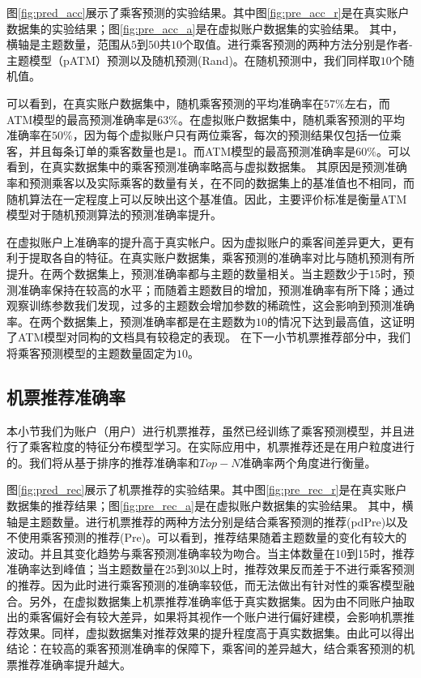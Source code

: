 图\ref{fig:pred_acc}展示了乘客预测的实验结果。其中图\ref{fig:pre_acc_r}是在真实账户数据集的实验结果；图\ref{fig:pre_acc_a}是在虚拟账户数据集的实验结果。
其中，横轴是主题数量，范围从$5$到$50$共$10$个取值。进行乘客预测的两种方法分别是作者-主题模型（pATM）预测以及随机预测(Rand)。在随机预测中，我们同样取$10$个随机值。

可以看到，在真实账户数据集中，随机乘客预测的平均准确率在$57\%$左右，而ATM模型的最高预测准确率是$63\%$。在虚拟账户数据集中，随机乘客预测的平均准确率在$50\%$，因为每个虚拟账户只有两位乘客，每次的预测结果仅包括一位乘客，并且每条订单的乘客数量也是$1$。而ATM模型的最高预测准确率是$60\%$。可以看到，在真实数据集中的乘客预测准确率略高与虚拟数据集。
其原因是预测准确率和预测乘客以及实际乘客的数量有关，在不同的数据集上的基准值也不相同，而随机算法在一定程度上可以反映出这个基准值。因此，主要评价标准是衡量ATM模型对于随机预测算法的预测准确率提升。

在虚拟账户上准确率的提升高于真实帐户。因为虚拟账户的乘客间差异更大，更有利于提取各自的特征。在真实账户数据集，乘客预测的准确率对比与随机预测有所提升。在两个数据集上，预测准确率都与主题的数量相关。当主题数少于$15$时，预测准确率保持在较高的水平；而随着主题数目的增加，预测准确率有所下降；通过观察训练参数我们发现，过多的主题数会增加参数的稀疏性，这会影响到预测准确率。在两个数据集上，预测准确率都是在主题数为$10$的情况下达到最高值，这证明了ATM模型对同构的文档具有较稳定的表现。
在下一小节机票推荐部分中，我们将乘客预测模型的主题数量固定为$10$。


\subsection{机票推荐准确率}
本小节我们为账户（用户）进行机票推荐，虽然已经训练了乘客预测模型，并且进行了乘客粒度的特征分布模型学习。在实际应用中，机票推荐还是在用户粒度进行的。我们将从基于排序的推荐准确率和$Top-N$准确率两个角度进行衡量。

\begin{figure}
\centering
{}
\end{figure}

图\ref{fig:pred_rec}展示了机票推荐的实验结果。其中图\ref{fig:pre_rec_r}是在真实账户数据集的推荐结果；图\ref{fig:pre_rec_a}是在虚拟账户数据集的实验结果。
其中，横轴是主题数量。进行机票推荐的两种方法分别是结合乘客预测的推荐(pdPre)以及不使用乘客预测的推荐(Pre)。可以看到，推荐结果随着主题数量的变化有较大的波动。并且其变化趋势与乘客预测准确率较为吻合。当主体数量在10到15时，推荐准确率达到峰值；当主题数量在$25$到$30$以上时，推荐效果反而差于不进行乘客预测的推荐。因为此时进行乘客预测的准确率较低，而无法做出有针对性的乘客模型融合。另外，在虚拟数据集上机票推荐准确率低于真实数据集。因为由不同账户抽取出的乘客偏好会有较大差异，如果将其视作一个账户进行偏好建模，会影响机票推荐效果。同样，虚拟数据集对推荐效果的提升程度高于真实数据集。由此可以得出结论：在较高的乘客预测准确率的保障下，乘客间的差异越大，结合乘客预测的机票推荐准确率提升越大。


